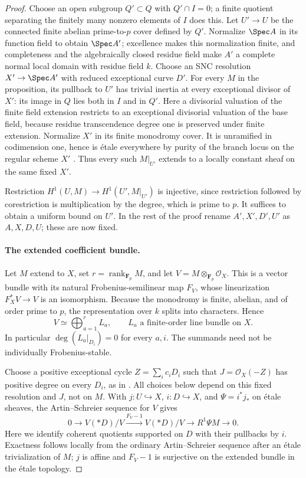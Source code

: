 \begin{proof}
Choose an open subgroup $Q'\subset Q$ with $Q'\cap I=0$; a finite
quotient separating the finitely many nonzero elements of $I$ does
this. Let $U'\to U$ be the connected finite abelian prime-to-$p$
cover defined by $Q'$. Normalize $\Spec A$ in its function field to
obtain $\Spec A'$; excellence makes this normalization finite, and
completeness and the algebraically closed residue field make $A'$
a complete normal local domain with residue field $k$.
Choose an SNC resolution $X'\to\Spec A'$ with reduced exceptional
curve $D'$. For every $M$ in the proposition, its pullback to $U'$
has trivial inertia at every exceptional divisor of $X'$: its image
in $Q$ lies both in $I$ and in $Q'$. Here a divisorial valuation of
the finite field extension restricts to an exceptional divisorial
valuation of the base field, because residue transcendence degree one
is preserved under finite extension. Normalize $X'$ in its finite
monodromy cover. It is unramified in codimension one, hence is
\'etale everywhere by purity of the branch locus on the regular
scheme $X'$ \cite[Lemma 58.21.4, tag 0BMB]{StacksBranchPurity}.
Thus every such $M|_{U'}$ extends to a locally constant
sheaf on the same fixed $X'$.

Restriction
$H^1(U,M)\to H^1(U',M|_{U'})$ is injective, since restriction followed
by corestriction is multiplication by the degree, which is prime to
$p$. It suffices to obtain a uniform bound on $U'$. In the rest of
the proof rename $A',X',D',U'$ as $A,X,D,U$; these are now fixed.

\paragraph{The extended coefficient bundle.}
Let $M$ extend to $X$, set $r=\operatorname{rank}_{\mathbf F_p}M$, and
let $V=M\otimes_{\mathbf F_p}\mathcal O_X$. This is a vector bundle
with its natural Frobenius-semilinear map $F_V$, whose linearization
$F_X^*V\to V$ is an isomorphism. Because the monodromy is finite,
abelian, and of order prime to $p$, the representation over $k$
splits into characters. Hence
\[
 V\simeq\bigoplus_{a=1}^r L_a,
 \qquad L_a\text{ a finite-order line bundle on }X.
\]
In particular $\deg(L_a|_{D_i})=0$ for every $a,i$.
The summands need not be individually Frobenius-stable.

Choose a positive exceptional cycle $Z=\sum_i c_iD_i$ such that
$J=\mathcal O_X(-Z)$ has positive degree on every $D_i$, as in
\cite[p.~6]{Suzuki2023}. All choices below depend on this fixed
resolution and $J$, not on $M$.
With $j:U\hookrightarrow X$, $i:D\hookrightarrow X$, and
$\Psi=i^*j_*$ on \'etale sheaves, the Artin--Schreier sequence for
$V$ gives
\[
 0\longrightarrow V(*D)/V
 \xrightarrow{F_V-1} V(*D)/V
 \longrightarrow R^1\Psi M\longrightarrow0.
\]
Here we identify coherent quotients supported on $D$ with their
pullbacks by $i$. Exactness follows locally from the ordinary
Artin--Schreier sequence after an \'etale trivialization of $M$;
$j$ is affine and $F_V-1$ is surjective on the extended bundle in
the \'etale topology.


\end{proof}
